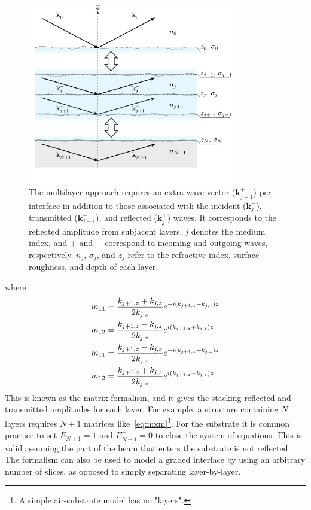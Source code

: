 \documentclass[10pt,twoside, b5paper,pdftex]{report}
\begin{document}
%
\begin{figure}[htbp]
	\begin{center}
		\includegraphics[width=0.8\textwidth]{figures/ML.pdf}		
	\end{center}
	\caption{The multilayer approach requires an extra wave vector ($\mathbf{k}_{j+1}^{+}$) per interface in addition to those associated with the incident ($\mathbf{k}_j^{-}$), transmitted ($\mathbf{k}_{j+1}^{-}$), and reflected ($\mathbf{k}_{j}^{+}$) waves. It corresponds to the reflected amplitude from subjacent layers. $j$ denotes the medium index, and $+$ and $-$ correspond to incoming and outgoing waves, respectively. $n_j$, $\sigma_j$, and $z_j$ refer to the refractive index, surface roughness, and depth of each layer.\label{fig:notation}}
\end{figure}
where 
%
\begin{align}
m_{11} &= \frac{k_{j+1,z} + k_{j,z}}{2k_{j,z}}e^{-i\left(k_{j+1,z} - k_{j,z}\right)z} \notag\\
m_{12} &= \frac{k_{j+1,z} - k_{j,z}}{2k_{j,z}}e^{i\left(k_{j+1,z} + k_{j,z}\right)z} \\
m_{11} &= \frac{k_{j+1,z} - k_{j,z}}{2k_{j,z}}e^{-i\left(k_{j+1,z} + k_{j,z}\right)z} \notag\\
m_{12} &= \frac{k_{j+1,z} + k_{j,z}}{2k_{j,z}}e^{i\left(k_{j+1,z} - k_{j,z}\right)z}\notag.
\end{align}
This is known as the matrix formalism, and it gives the stacking reflected and transmitted amplitudes for each layer. For example, a structure containing $N$ layers requires $N+1$ matrices like~\cref{eq:mxm}\footnote{A simple air-substrate model has no "layers".}. For the substrate it is common practice to set $E^{-}_{N+1} = 1$ and $E^{+}_{N+1} = 0$ to close the system of equations. This is valid assuming the part of the beam that enters the substrate is not reflected. The formalism can also be used to model a graded interface by using an arbitrary number of slices, as opposed to simply separating layer-by-layer. 
\end{document}
